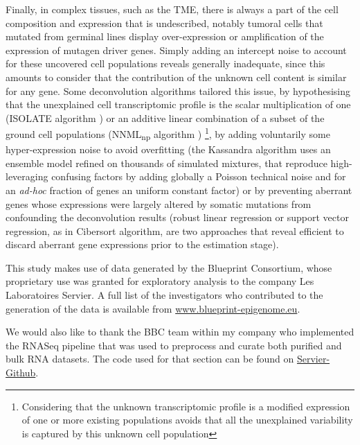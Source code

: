 \documentclass[long, final]{jobim}
\begin{document}
Finally, in complex tissues, such as the TME, there is always a part of the cell composition and expression that is undescribed, notably tumoral cells that mutated from germinal lines display over-expression or amplification of the expression of mutagen driver genes. Simply adding an intercept noise to account for these uncovered cell populations reveals generally inadequate, since this amounts to consider that the contribution of the unknown cell content is similar for any gene. Some deconvolution algorithms tailored this issue, by hypothesising that the unexplained cell transcriptomic profile is the scalar multiplication of one (ISOLATE algorithm \cite{quon_morris09}) or an additive linear combination of a subset of the ground cell populations (NNML\textsubscript{np} algorithm \cite{qiao_etal12}) \footnote{Considering that the unknown transcriptomic profile is a modified expression of one or more existing populations avoids that all the unexplained variability is captured by this unknown cell population}, by adding voluntarily some hyper-expression noise to avoid overfitting (the Kassandra algorithm uses an ensemble model refined on thousands of simulated mixtures, that reproduce high-leveraging confusing factors by adding globally a Poisson technical noise and for an \textit{ad-hoc} fraction of genes an uniform constant factor) or by preventing aberrant genes whose expressions were largely altered by somatic mutations from confounding the deconvolution results (robust linear regression or support vector regression, as in Cibersort algorithm, are two approaches that reveal efficient to discard aberrant gene expressions prior to the estimation stage).  


\begin{acknowledgements}
  \label{sec:acknowledgements}
This study makes use of data generated by the Blueprint Consortium, whose proprietary use was granted for exploratory analysis to the company Les Laboratoires Servier. A full list of the investigators who contributed to the generation of the data is available from \url{www.blueprint-epigenome.eu}.

We would also like to thank the BBC team within my company who implemented the RNASeq pipeline that was used to preprocess and curate both purified and bulk RNA datasets. The code used for that section can be found on \href{https://github.com/orgs/servier-github/repositories}{Servier-Github}.

\end{acknowledgements}
\end{document}
